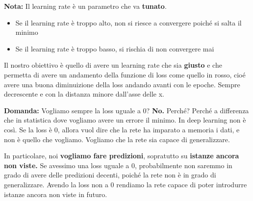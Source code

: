 
\textbf{Nota:} Il learning rate è un parametro che va \textbf{tunato}.
\begin{itemize}
    \item Se il learning rate è troppo alto, non si riesce a convergere poiché si
          salta il minimo
    \item Se il learning rate è troppo basso, si rischia di non convergere mai
\end{itemize}

Il nostro obiettivo è quello di avere un learning rate che sia \textbf{giusto} e che permetta di avere un andamento della funzione di loss come quello in rosso, cioé avere una buona
diminuizione della loss andando avanti con le epoche. Sempre decrescente e con la distanza minore dall'asse delle x.

\textbf{Domanda:} Vogliamo sempre la loss uguale a 0? \textbf{No.}
Perché? Perché a differenza che in statistica dove vogliamo avere un errore il minimo.
In deep learning non è così. Se la loss è 0, allora vuol dire che la rete ha
imparato a memoria i dati, e non è quello che vogliamo. Vogliamo che la rete
sia capace di generalizzare.

In particolare, noi \textbf{vogliamo fare predizioni}, sopratutto su \textbf{istanze ancora non viste.} Se avessimo una loss uguale a 0, probabilmente non 
saremmo in grado di avere delle predizioni decenti, poiché la rete non è in grado di generalizzare.
Avendo la loss non a 0 rendiamo la rete capace di poter introdurre istanze ancora non viste in futuro.

